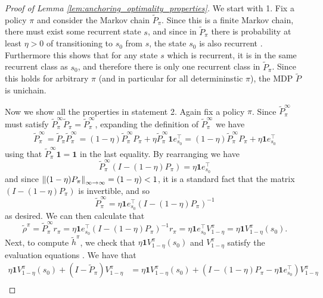 \documentclass{article}
\theoremstyle{plain}
\theoremstyle{plain}
\theoremstyle{remark}
\theoremstyle{plain}
\theoremstyle{plain}
\newcommand{\one}{\mathbf{1}}
\newcommand{\htilde}{\widetilde{h}}
\newcommand{\rhot}{\widetilde{\rho}}
\begin{document}
\begin{proof}[Proof of Lemma \ref{lem:anchoring_optimality_properties}]
    We start with 1. Fix a policy $\pi$ and consider the Markov chain $\widetilde{P}_\pi$. Since this is a finite Markov chain, there must exist some recurrent state $s$, and since in $\widetilde{P}_\pi$ there is probability at least $\eta> 0$ of transitioning to $s_0$ from $s$, the state $s_0$ is also recurrent \cite[Chapter 5.3]{durrett_probability_2019}. Furthermore this shows that for any state $s$ which is recurrent, it is in the same recurrent class as $s_0$, and therefore there is only one recurrent class in $\widetilde{P}_\pi$. Since this holds for arbitrary $\pi$ (and in particular for all determininstic $\pi$), the MDP $\widetilde{P}$ is unichain.

    Now we show all the properties in statement 2. Again fix a policy $\pi$. Since $\widetilde{P}_\pi^\infty$ must satisfy $\widetilde{P}_\pi^\infty \widetilde{P}_\pi = \widetilde{P}_\pi^\infty$, expanding the definition of $\widetilde{P}_\pi^\infty$ we have
    \begin{align*}
        \widetilde{P}_\pi^\infty = \widetilde{P}_\pi \widetilde{P}_\pi^\infty = (1-\eta) \widetilde{P}_\pi^\infty P_\pi + \eta \widetilde{P}_\pi^\infty \one e_{s_0}^\top = (1-\eta) \widetilde{P}_\pi^\infty P_\pi + \eta  \one e_{s_0}^\top
    \end{align*}
    using that $\widetilde{P}_\pi^\infty\one = \one$ in the last equality. By rearranging we have
    \[
        \widetilde{P}_\pi^\infty \left(I - (1-\eta) P_\pi\right) = \eta \one e_{s_0}^\top 
    \]
    and since $\left\Vert (1-\eta) P_\pi\right\Vert _{\infty \to \infty} = (1-\eta) < 1$, it is a standard fact that the matrix $\left(I - (1-\eta) P_\pi\right)$ is invertible, and so
    \[
    \widetilde{P}_\pi^\infty = \eta \one e_{s_0}^\top \left(I - (1-\eta) P_\pi\right)^{-1}
    \]
    as desired. We can then calculate that
    \[
        \rhot^\pi = \widetilde{P}_\pi^\infty r_\pi = \eta \one e_{s_0}^\top \left(I - (1-\eta) P_\pi\right)^{-1} r_\pi =  \eta \one e_{s_0}^\top V_{1-\eta}^\pi = \eta \one V_{1-\eta}^\pi(s_0).
    \]
    Next, to compute $\htilde^\pi$, we check that $\eta \one V_{1-\eta}^\pi(s_0)$ and $ V_{1-\eta}^\pi$ satisfy the evaluation equations \cite[Section 8.2.3]{puterman_markov_1994}. We have that
    \begin{align*}
        \eta \one V_{1-\eta}^\pi(s_0) + (I - \widetilde{P}_\pi) V_{1-\eta}^\pi &= \eta \one V_{1-\eta}^\pi(s_0) +  (I - (1-\eta)P_\pi - \eta \one e_{s_0}^\top) V_{1-\eta}^\pi \\

\end{align*}
\end{proof}
\end{document}
